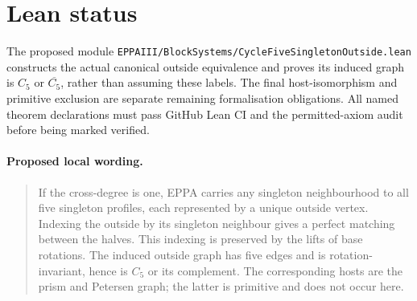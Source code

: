 \documentclass[11pt,a4paper]{article}
\begin{document}
\section*{Lean status}
The proposed module
\texttt{EPPAIII/BlockSystems/CycleFiveSingletonOutside.lean}
constructs the actual canonical outside equivalence
and proves its induced graph is \(C_5\) or
\(\overline{C_5}\), rather than assuming these labels.
The final host-isomorphism and primitive exclusion are
separate remaining formalisation obligations.
All named theorem declarations must pass GitHub Lean
CI and the permitted-axiom audit before being marked
verified.

\paragraph{Proposed local wording.}
\begin{quote}
If the cross-degree is one, EPPA carries any
singleton neighbourhood to all five singleton
profiles, each represented by a unique outside
vertex. Indexing the outside by its singleton
neighbour gives a perfect matching between the
halves. This indexing is preserved by the lifts
of base rotations. The induced outside graph
has five edges and is rotation-invariant, hence
is \(C_5\) or its complement. The corresponding
hosts are the prism and Petersen graph; the
latter is primitive and does not occur here.
\end{quote}
\end{document}
